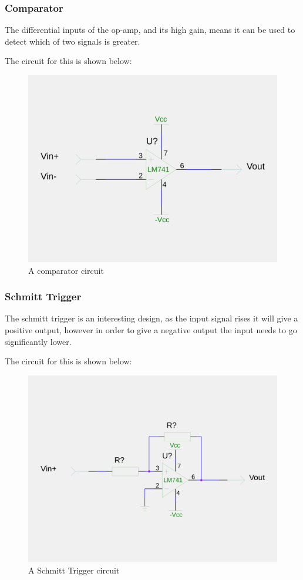 \subsubsection{Comparator}
The differential inputs of the op-amp, and its high gain, means it can be used to detect which of two signals is greater.

The circuit for this is shown below:

\begin{figure}[H]
	\centering
	\includegraphics[width=\textwidth]{./images/comparator.png}
	\caption{A comparator circuit}
	\label{fig:comparator}
\end{figure}

\subsubsection{Schmitt Trigger}
The schmitt trigger is an interesting design, as the input signal rises it will give a positive output, however in order to give a negative output the input needs to go significantly lower.

The circuit for this is shown below:

\begin{figure}[H]
	\centering
	\includegraphics[width=\textwidth]{./images/schmitt.png}
	\caption{A Schmitt Trigger circuit}
	\label{fig:schmitt}
\end{figure}

